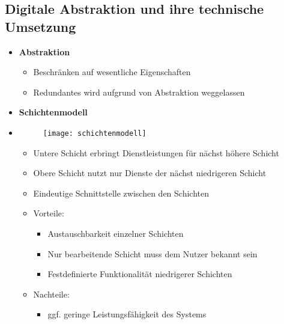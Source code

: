 \subsection{Digitale Abstraktion und ihre technische Umsetzung}
\begin{itemize}

\item \textbf{Abstraktion}
	\begin{itemize}
	\item Beschränken auf wesentliche Eigenschaften
	\item Redundantes wird aufgrund von Abstraktion weggelassen
	\end{itemize}

\item \textbf{Schichtenmodell}
\item[] 
	\begin{minipage}{0.225\textwidth}
		\begin{figure}[H]
		\texttt{[image: schichtenmodell]}
		\end{figure}
	\end{minipage}
	\begin{minipage}[t]{0.7\textwidth}
		\vspace{-3.5cm}
		\begin{itemize}
		\item Untere Schicht erbringt Dienstleistungen für nächst höhere Schicht
		\item Obere Schicht nutzt nur Dienste der nächst niedrigeren Schicht
		\item Eindeutige Schnittstelle zwischen den Schichten
		\item Vorteile: 
			\begin{itemize}
			\item Austauschbarkeit einzelner Schichten
			\item Nur bearbeitende Schicht muss dem Nutzer bekannt sein
			\item Festdefinierte Funktionalität niedrigerer Schichten
			\end{itemize}
		\item Nachteile:
			\begin{itemize}
			\item ggf. geringe Leistungsfähigkeit des Systems
			\end{itemize}
		\end{itemize}
	\end{minipage}

\vspace{0.4cm}


\end{itemize}

